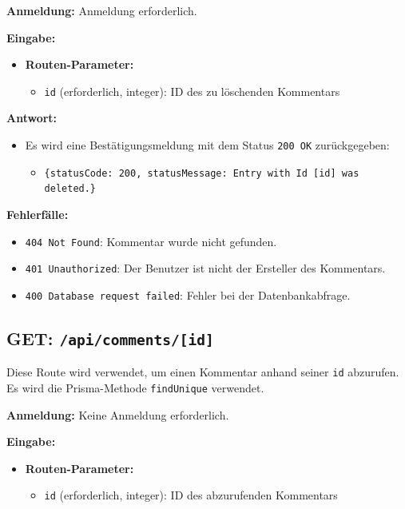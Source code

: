 \documentclass[a4paper,12pt]{article}
\begin{document}
\textbf{Anmeldung:} Anmeldung erforderlich.

\textbf{Eingabe:}
\begin{itemize}
    \item \textbf{Routen-Parameter:}
    \begin{itemize}
        \item \texttt{id} (erforderlich, integer):
            ID des zu löschenden Kommentars
    \end{itemize}
\end{itemize}

\textbf{Antwort:}
\begin{itemize}
    \item Es wird eine Bestätigungsmeldung mit dem Status
        \texttt{200 OK} zurückgegeben:
    \begin{itemize}
        \item \texttt{\{statusCode: 200,
            statusMessage: Entry with Id [id] was deleted.\}}
    \end{itemize}
\end{itemize}

\textbf{Fehlerfälle:}
\begin{itemize}
    \item \texttt{404 Not Found}:
        Kommentar wurde nicht gefunden.
    \item \texttt{401 Unauthorized}:
        Der Benutzer ist nicht der Ersteller des Kommentars.
    \item \texttt{400 Database request failed}:
        Fehler bei der Datenbankabfrage.
\end{itemize}

\subsection{GET: \texttt{/api/comments/[id]}}

Diese Route wird verwendet, um einen Kommentar anhand seiner \texttt{id}
abzurufen. Es wird die Prisma-Methode \texttt{findUnique} verwendet.

\textbf{Anmeldung:} Keine Anmeldung erforderlich.

\textbf{Eingabe:}
\begin{itemize}
    \item \textbf{Routen-Parameter:}
    \begin{itemize}
        \item \texttt{id} (erforderlich, integer):
            ID des abzurufenden Kommentars
    \end{itemize}
\end{itemize}
\end{document}
